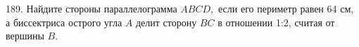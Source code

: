 189. Найдите стороны параллелограмма $ABCD,$ если его периметр равен 64 см, а биссектриса острого угла $A$ делит сторону $BC$ в отношении 1:2, считая от вершины $B.$\\
